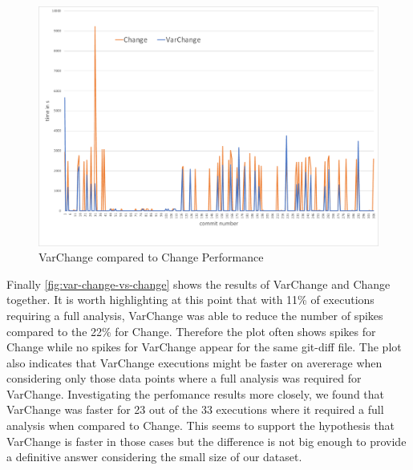 \documentclass[a4paper]{article}
\begin{document}
\begin{figure}[h] 
  \centering
  \begin{minipage}[b]{1\textwidth} 
    \caption[VarChange compared to Change Performance]{VarChange compared to Change Performance}\label{fig:var-change-vs-change}
    \centering
    \includegraphics[height=1\textwidth, angle=90]{img/var-change-vs-change.pdf}
  \end{minipage}
\end{figure}


Finally \autoref{fig:var-change-vs-change} shows the results of \textcolor{blue!80!black}{VarChange} and \textcolor{orange!80!black}{Change} together. It is worth highlighting at this point that with 11\% of executions requiring a full analysis, VarChange was able to reduce the number of spikes compared to the 22\% for Change. Therefore the plot often shows spikes for Change while no spikes for VarChange appear for the same git-diff file.
The plot also indicates that VarChange executions might be faster on avererage when considering only those data points where a full analysis was required for VarChange. Investigating the perfomance results more closely, we found that VarChange was faster for 23 out of the 33 executions where it required a full analysis when compared to Change. This seems to support the hypothesis that VarChange is faster in those cases but the difference is not big enough to provide a definitive answer considering the small size of our dataset.
 
\end{document}
